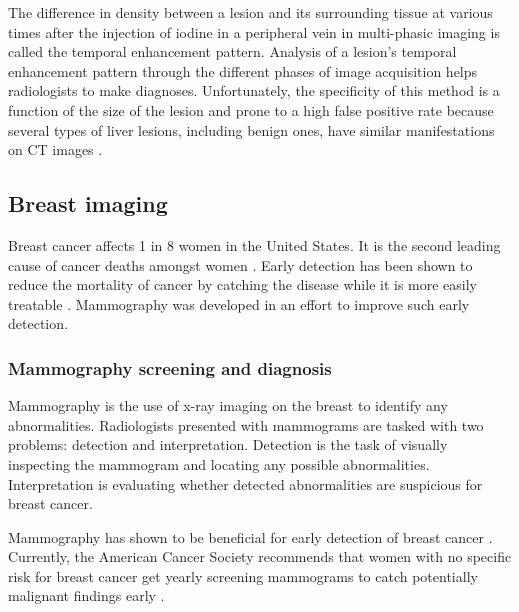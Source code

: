 The difference in density between a lesion and its surrounding tissue at various times after the injection of iodine in a peripheral vein in multi-phasic imaging is called the temporal enhancement pattern. Analysis of a lesion's temporal enhancement pattern through the different phases of image acquisition helps radiologists to make diagnoses. Unfortunately, the specificity of this method is a function of the size of the lesion and prone to a high false positive rate because several types of liver lesions, including benign ones, have similar manifestations on CT images \cite{Lencioni:2005ia}.

\subsection{Breast imaging}
Breast cancer affects 1 in 8 women in the United States. It is the second leading cause of cancer deaths amongst women \cite{Siegel:2012kt}. Early detection has been shown to reduce the mortality of cancer by catching the disease while it is more easily treatable \cite{Baker:1982jg}. Mammography was developed in an effort to improve such early detection.

\subsubsection{Mammography screening and diagnosis}
Mammography is the use of x-ray imaging on the breast to identify any abnormalities. Radiologists presented with mammograms are tasked with two problems: detection and interpretation. Detection is the task of visually inspecting the mammogram and locating any possible abnormalities. Interpretation is evaluating whether detected abnormalities are suspicious for breast cancer.

Mammography has shown to be beneficial for early detection of breast cancer \cite{Nystrom:2002hb}. Currently, the American Cancer Society recommends that women with no specific risk for breast cancer get yearly screening mammograms to catch potentially malignant findings early \cite{Smith:2003en}.

